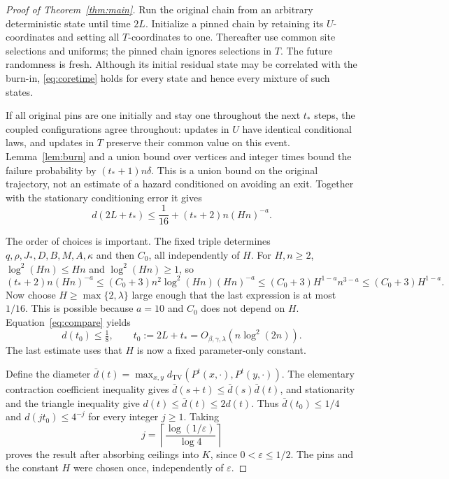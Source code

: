 \documentclass[11pt]{article}
\theoremstyle{remark}\newtheorem{remark}[theorem]{Remark}
\newcommand{\TV}{d_{\mathrm{TV}}}
\begin{document}
\begin{proof}[Proof of Theorem~\ref{thm:main}]
Run the original chain from an arbitrary deterministic state until time
$2L$. Initialize a pinned chain by retaining its $U$-coordinates and
setting all $T$-coordinates to one. Thereafter use common site selections
and uniforms; the pinned chain ignores selections in $T$. The future
randomness is fresh. Although its initial residual state may be correlated
with the burn-in, \eqref{eq:coretime} holds for every state and hence every
mixture of such states.

If all original pins are one initially and stay one throughout the next
$t_*$ steps, the coupled configurations agree throughout: updates in $U$
have identical conditional laws, and updates in $T$ preserve their
common value on this event. Lemma~\ref{lem:burn} and a union bound over
vertices and integer times bound the failure probability by
$(t_*+1)n\delta$. This is a union bound on the original trajectory,
not an estimate of a hazard conditioned on avoiding an exit.
Together with the stationary conditioning error it gives
\begin{equation}\label{eq:compare}
 d(2L+t_*)\leq\frac1{16}+(t_*+2)n(Hn)^{-a}.
\end{equation}

The order of choices is important. The fixed triple determines
$q,\rho,J_*,D,B,M,A,\kappa$ and then $C_0$, all independently of $H$.
For $H,n\geq2$, $\log^2(Hn)\leq Hn$ and $\log^2(Hn)\geq1$, so
\[
 (t_*+2)n(Hn)^{-a}
 \leq(C_0+3)n^2\log^2(Hn)(Hn)^{-a}
 \leq(C_0+3)H^{1-a}n^{3-a}
 \leq(C_0+3)H^{1-a}.
\]
Now choose $H\geq\max\{2,\lambda\}$ large enough that the last expression
is at most $1/16$. This is possible because $a=10$ and $C_0$ does not
depend on $H$. Equation~\eqref{eq:compare} yields
\[
 d(t_0)\leq\tfrac18,\qquad
 t_0:=2L+t_*=O_{\beta,\gamma,\lambda}(n\log^2(2n)).
\]
The last estimate uses that $H$ is now a fixed parameter-only constant.

Define the diameter
$\bar d(t)=\max_{x,y}\TV(P^t(x,\cdot),P^t(y,\cdot))$.
The elementary contraction coefficient inequality gives
$\bar d(s+t)\leq\bar d(s)\bar d(t)$, and stationarity and the triangle
inequality give $d(t)\leq\bar d(t)\leq2d(t)$.
Thus $\bar d(t_0)\leq1/4$ and $d(jt_0)\leq4^{-j}$ for every integer
$j\geq1$. Taking
\[
 j=\left\lceil\frac{\log(1/\varepsilon)}{\log4}\right\rceil
\]
proves the result after absorbing ceilings into $K$, since
$0<\varepsilon\leq1/2$. The pins and the constant $H$ were chosen once,
independently of $\varepsilon$.
\end{proof}
\end{document}
